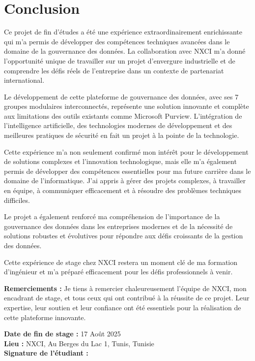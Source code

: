 \documentclass[12pt,a4paper]{article}
\begin{document}
\section{Conclusion}

Ce projet de fin d'études a été une expérience extraordinairement enrichissante qui m'a permis de développer des compétences techniques avancées dans le domaine de la gouvernance des données. La collaboration avec NXCI m'a donné l'opportunité unique de travailler sur un projet d'envergure industrielle et de comprendre les défis réels de l'entreprise dans un contexte de partenariat international.

Le développement de cette plateforme de gouvernance des données, avec ses 7 groupes modulaires interconnectés, représente une solution innovante et complète aux limitations des outils existants comme Microsoft Purview. L'intégration de l'intelligence artificielle, des technologies modernes de développement et des meilleures pratiques de sécurité en fait un projet à la pointe de la technologie.

Cette expérience m'a non seulement confirmé mon intérêt pour le développement de solutions complexes et l'innovation technologique, mais elle m'a également permis de développer des compétences essentielles pour ma future carrière dans le domaine de l'informatique. J'ai appris à gérer des projets complexes, à travailler en équipe, à communiquer efficacement et à résoudre des problèmes techniques difficiles.

Le projet a également renforcé ma compréhension de l'importance de la gouvernance des données dans les entreprises modernes et de la nécessité de solutions robustes et évolutives pour répondre aux défis croissants de la gestion des données.

Cette expérience de stage chez NXCI restera un moment clé de ma formation d'ingénieur et m'a préparé efficacement pour les défis professionnels à venir.

\vspace{1cm}

\textbf{Remerciements :}
Je tiens à remercier chaleureusement l'équipe de NXCI, mon encadrant de stage, et tous ceux qui ont contribué à la réussite de ce projet. Leur expertise, leur soutien et leur confiance ont été essentiels pour la réalisation de cette plateforme innovante.

\vspace{0.5cm}

\textbf{Date de fin de stage :} 17 Août 2025\\
\textbf{Lieu :} NXCI, Au Berges du Lac 1, Tunis, Tunisie\\
\textbf{Signature de l'étudiant :}
\end{document}
